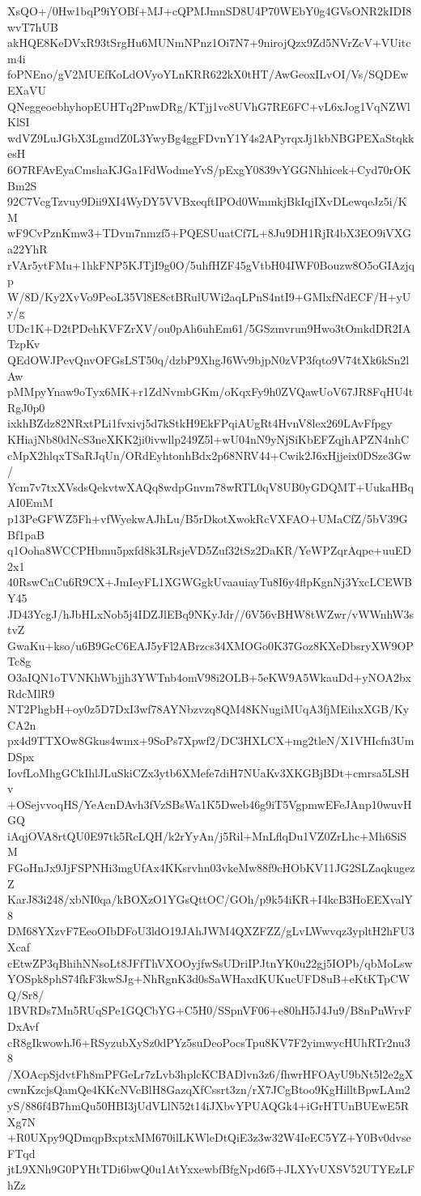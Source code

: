 XsQO+/0Hw1bqP9iYOBf+MJ+cQPMJmnSD8U4P70WEbY0g4GVsONR2kIDI8wvT7hUB
akHQE8KeDVxR93tSrgHu6MUNmNPnz1Oi7N7+9nirojQzx9Zd5NVrZcV+VUitcm4i
foPNEno/gV2MUEfKoLdOVyoYLnKRR622kX0tHT/AwGeoxILvOI/Vs/SQDEwEXaVU
QNeggeoebhyhopEUHTq2PnwDRg/KTjj1vc8UVhG7RE6FC+vL6xJog1VqNZWlKlSI
wdVZ9LuJGbX3LgmdZ0L3YwyBg4ggFDvnY1Y4s2APyrqxJj1kbNBGPEXaStqkkesH
6O7RFAvEyaCmshaKJGa1FdWodmeYvS/pExgY0839vYGGNhhicek+Cyd70rOKBm2S
92C7VcgTzvuy9Dii9XI4WyDY5VVBxeqftIPOd0WmmkjBkIqjIXvDLewqeJz5i/KM
wF9CvPznKmw3+TDvm7nmzf5+PQESUuatCf7L+8Ju9DH1RjR4bX3EO9iVXGa22YhR
rVAr5ytFMu+1hkFNP5KJTjI9g0O/5uhfHZF45gVtbH04IWF0Bouzw8O5oGIAzjqp
W/8D/Ky2XvVo9PeoL35Vl8E8ctBRulUWi2aqLPnS4ntI9+GMlxfNdECF/H+yUy/g
UDc1K+D2tPDehKVFZrXV/ou0pAh6uhEm61/5GSzmvrun9Hwo3tOmkdDR2IATzpKv
QEdOWJPevQnvOFGsLST50q/dzbP9XhgJ6Wv9bjpN0zVP3fqto9V74tXk6kSn2lAw
pMMpyYnaw9oTyx6MK+r1ZdNvmbGKm/oKqxFy9h0ZVQawUoV67JR8FqHU4tRgJ0p0
ixkhBZdz82NRxtPLi1fvxivj5d7kStkH9EkFPqiAUgRt4HvnV8lex269LAvFfpgy
KHiajNb80dNcS3neXKK2ji0ivwllp249Z5l+wU04nN9yNjSiKbEFZqjhAPZN4nhC
cMpX2hlqxTSaRJqUn/ORdEyhtonhBdx2p68NRV44+Cwik2J6xHjjeix0DSze3Gw/
Ycm7v7txXVsdsQekvtwXAQq8wdpGnvm78wRTL0qV8UB0yGDQMT+UukaHBqAI0EmM
p13PeGFWZ5Fh+vfWyekwAJhLu/B5rDkotXwokRcVXFAO+UMaCfZ/5bV39GBf1paB
q1Ooha8WCCPHbmu5pxfd8k3LRsjeVD5Zuf32tSz2DaKR/YeWPZqrAqpe+uuED2x1
40RswCnCu6R9CX+JmIeyFL1XGWGgkUvaauiayTu8I6y4flpKgnNj3YxcLCEWBY45
JD43YcgJ/hJbHLxNob5j4IDZJlEBq9NKyJdr//6V56vBHW8tWZwr/vWWnhW3stvZ
GwaKu+kso/u6B9GcC6EAJ5yFl2ABrzcs34XMOGo0K37Goz8KXeDbsryXW9OPTc8g
O3aIQN1oTVNKhWbjjh3YWTnb4omV98i2OLB+5eKW9A5WkauDd+yNOA2bxRdcMlR9
NT2PhgbH+oy0z5D7DxI3wf78AYNbzvzq8QM48KNugiMUqA3fjMEihxXGB/KyCA2n
px4d9TTXOw8Gkus4wmx+9SoPs7Xpwf2/DC3HXLCX+mg2tleN/X1VHIcfn3UmDSpx
IovfLoMhgGCkIhlJLuSkiCZx3ytb6XMefe7diH7NUaKv3XKGBjBDt+cmrsa5LSHv
+OSejvvoqHS/YeAcnDAvh3fVzSBsWa1K5Dweb46g9iT5VgpmwEFeJAnp10wuvHGQ
iAqjOVA8rtQU0E97tk5RcLQH/k2rYyAn/j5Ril+MnLflqDu1VZ0ZrLhc+Mh6SiSM
FGoHnJx9JjFSPNHi3mgUfAx4KKsrvhn03vkeMw88f9cHObKV11JG2SLZaqkugezZ
KarJ83i248/xbNI0qa/kBOXzO1YGsQttOC/GOh/p9k54iKR+I4kcB3HoEEXvalY8
DM68YXzvF7EeoOIbDFoU3ldO19JAhJWM4QXZFZZ/gLvLWwvqz3ypltH2hFU3Xcaf
cEtwZP3qBhihNNsoLt8JFfThVXOOyjfwSsUDriIPJtnYK0u22gj5IOPb/qbMoLsw
YOSpk8phS74fkF3kwSJg+NhRgnK3d0sSaWHaxdKUKucUFD8uB+eKtKTpCWQ/Sr8/
1BVRDs7Mn5RUqSPe1GQCbYG+C5H0/SSpnVF06+e80hH5J4Ju9/B8nPnWrvFDxAvf
cR8gIkwowhJ6+RSyzubXySz0dPYz5suDeoPocsTpu8KV7F2yimwycHUhRTr2nu38
/XOAcpSjdvtFh8mPFGeLr7zLvb3hplcKCBADlvn3z6/fhwrHFOAyU9bNt5l2e2gX
cwnKzcjsQamQe4KKcNVcBlH8GazqXfCssrt3zn/rX7JCgBtoo9KgHilltBpwLAm2
yS/886f4B7hmQu50HBI3jUdVLlN52t14iJXbvYPUAQGk4+iGrHTUnBUEwE5RXg7N
+R0UXpy9QDmqpBxptxMM670ilLKWleDtQiE3z3w32W4IeEC5YZ+Y0Bv0dvseFTqd
jtL9XNh9G0PYHtTDi6bwQ0u1AtYxxewbfBfgNpd6f5+JLXYvUXSV52UTYEzLFhZz

